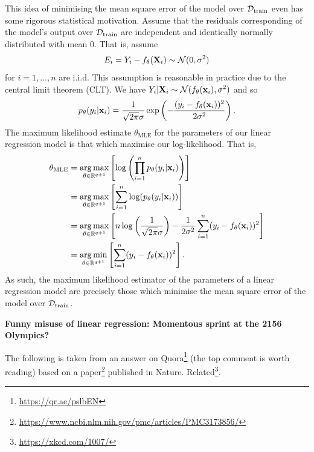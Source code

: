 \documentclass[11pt]{article}
\begin{document}
This idea of minimising the mean square error of the model over $\mathcal{D}_{\text{train}}$ even has some rigorous statistical motivation. Assume that the residuals corresponding of the model's output over $\mathcal{D}_{\text{train}}$ are independent and identically normally distributed with mean 0. That is, assume
$$
E_i
=
Y_i-f_{\theta}(\mathbf{X}_i)\sim\mathcal{N}(0, \sigma^2)
$$
for $i=1,\dots,n$ are i.i.d. This assumption is reasonable in practice due to the central limit theorem (CLT). We have $Y_i|\mathbf{X}_i\sim\mathcal{N}(f_{\theta}(\mathbf{x}_i), \sigma^2)$ and so
$$
p_{\theta}(y_i|\mathbf{x}_i)=\frac{1}{\sqrt{2\pi}\sigma}\exp\left(-\frac{(y_i-f_{\theta}(\mathbf{x}_i))^2}{2\sigma^2}\right).
$$
The maximum likelihood estimate $\theta_{\text{MLE}}$ for the parameters of our linear regression model is that which maximise our log-likelihood. That is,
\begin{align*}
    \theta_{\text{MLE}}
    &=
    \operatorname*{arg\,max}_{\theta\in\mathbb{R}^{q+1}}\left[\log\left(\prod_{i=1}^n p_{\theta}(y_i|\mathbf{x}_i)\right)\right]\\
    &=
    \operatorname*{arg\,max}_{\theta\in\mathbb{R}^{q+1}}\left[\sum_{i=1}^n\log(p_{\theta}(y_i|\mathbf{x}_i))\right]\\
    &=
    \operatorname*{arg\,max}_{\theta\in\mathbb{R}^{q+1}}\left[n\log\left(\frac{1}{\sqrt{2\pi}\sigma}\right)-\frac{1}{2\sigma^2}\sum_{i=1}^n(y_i-f_{\theta}(\mathbf{x}_i))^2\right]\\
    &=
    \operatorname*{arg\,min}_{\theta\in\mathbb{R}^{q+1}}\left[\sum_{i=1}^n(y_i-f_{\theta}(\mathbf{x}_i))^2\right].
\end{align*}
As such, the maximum likelihood estimator of the parameters of a linear regression model are precisely those which minimise the mean square error of the model over $\mathcal{D}_{\text{train}}$.

\begin{tcolorbox}[colback=c2]
    \textbf{Funny misuse of linear regression: Momentous sprint at the 2156 Olympics?}
    \vspace{10pt}

    The following is taken from an answer on Quora\footnote{\url{https://qr.ae/pslbEN}} (the top comment is worth reading) based on a paper\footnote{\url{https://www.ncbi.nlm.nih.gov/pmc/articles/PMC3173856/}} published in Nature. Related\footnote{\url{https://xkcd.com/1007/}}.
\end{tcolorbox}
\end{document}

